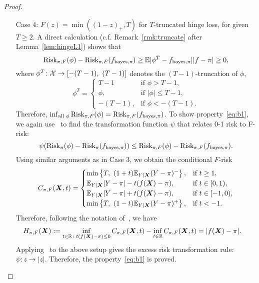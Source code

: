 \documentclass[11pt]{article}
\theoremstyle{plain}
\theoremstyle{definition}
\def\bayespif{f_{\textup{bayes},\pi}}
\def\risk{\textup{Risk}_\pi}
\def\riskF{\textup{Risk}_{\pi,F}}
\begin{document}
\begin{proof}
\begin{enumerate}[label={2.\arabic*},wide, labelwidth=!, labelindent=0pt]
\item[Case 4:] $F(z)=\min((1-z)_+,T)$ for $T$-truncated hinge loss, for given $T\geq 2$. 
A direct calculation (c.f. Remark~\ref{rmk:truncate} after Lemma~\ref{lem:hingeL1}) shows that
\[
\riskF(\phi)-\riskF(\bayespif)\geq \mathbb{E}|\phi^T -\bayespif||f-\pi|\geq0, 
\]
where $\phi^T\colon \mathcal{X}\to[-(T-1),\ (T-1)]$ denotes the $(T-1)$-truncation of $\phi$,
\begin{equation}\label{eq:Tphi}
\phi^T=
\begin{cases}
T-1 & \text{if }\phi>T-1,\\
\phi, & \text{if }|\phi|\leq T-1,\\
-(T-1), & \text{if }\phi<-(T-1).
\end{cases}
\end{equation}
Therefore, $\inf_{\text{all }\phi}\riskF(\phi)=\riskF(\bayespif)$. To show property~\eqref{eq:b1}, we again use~\citet[Theorem 1]{scott2011surrogate} to find the transformation function $\psi$ that relates 0-1 risk to F-risk:
\[
\psi(\risk(\phi)-\risk(\bayespif))\leq \riskF(\phi)-\riskF(\bayespif). 
\]
Using similar arguments as in Case 3, we obtain the conditional $F$-risk
\[
C_{\pi,F}(\bm X,t)=
\begin{cases}
\min\left\{T,\ (1+t)\mathbb{E}_{Y|\bm X}(Y-\pi)^{-}\right\}, & \text{if } t\geq 1,\\
\mathbb{E}_{Y|\bm X}|Y-\pi|-t(f(\bm X)-\pi), & \text{if } t\in[0,1),\\
\mathbb{E}_{Y|\bm X}|Y-\pi|+t(f(\bm X)-\pi), & \text{if } t\in[-1,0),\\
\min\left\{T,\ (1-t)\mathbb{E}_{Y|\bm X}(Y-\pi)^{+}\right\}, & \text{if } t<-1.\\
\end{cases}
\]
Therefore, following the notation of~\cite{scott2011surrogate}, we have
\begin{align}
H_{\pi,F}(\bm X)&:=\inf_{t\in\mathbb{R}\colon t(f(\bm X)-\pi)\leq 0}C_{\pi,F}(\bm X, t)-\inf_{t\in\mathbb{R}} C_{\pi,F}(\bm X, t) = |f(\bm X)-\pi|.
\end{align}
Applying~\citet[Theorem 1]{scott2011surrogate} to the above setup gives the excess risk transformation rule: $\psi: z\to|z|$. Therefore, the property~\eqref{eq:b1} is proved. 


\end{enumerate}
\end{proof}
\end{document}
